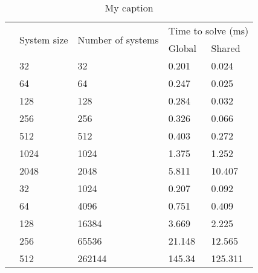 \begin{table}[]
\centering
\caption{My caption}
\label{my-label}
\begin{tabular}{|l|l|l|l|l|}
 \hline 
 & \multirow{2}{*}{System size} & \multirow{2}{*}{Number of systems} & \multicolumn{2}{l|}{Time to solve (ms)} \\ \cline{4-5}
 &                              &                                    & Global            & Shared             \\ \hline
 & 32                           & 32                                 & 0.201             & 0.024              \\ \hline
 & 64                           & 64                                 & 0.247             & 0.025              \\ \hline
 & 128                          & 128                                & 0.284             & 0.032              \\ \hline
 & 256                          & 256                                & 0.326             & 0.066              \\ \hline
 & 512                          & 512                                & 0.403             & 0.272              \\ \hline
 & 1024                         & 1024                               & 1.375             & 1.252              \\ \hline
 & 2048                         & 2048                               & 5.811             & 10.407             \\ \hline
 & 32                           & 1024                               & 0.207             & 0.092              \\ \hline
 & 64                           & 4096                               & 0.751             & 0.409              \\ \hline
 & 128                          & 16384                              & 3.669             & 2.225              \\ \hline
 & 256                          & 65536                              & 21.148            & 12.565             \\ \hline
 & 512                          & 262144                             & 145.34            & 125.311            \\ \hline 
\end{tabular}
\end{table}
